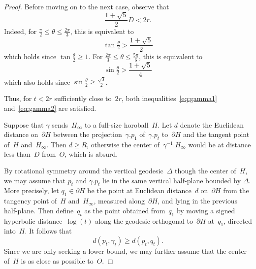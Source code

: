 \documentclass[10pt,a4paper]{amsart}
\newcommand{\HH}{{\mathbb H}}
\begin{document}
\begin{proof}
\medskip

Before moving on to the next case, observe that 
\[
\frac{1+\sqrt{5}}{2} D < 2r.
\]
Indeed, for $\frac{\pi}{2} \leq \theta \leq \frac{2\pi}{3}$, this is equivalent to
\[
\tan \tfrac{\theta}{2} > \frac{1+\sqrt{5}}{2}
\]
which holds since $\tan \frac{\theta}{2} \geq 1$.
For $\frac{2\pi}{3} \leq \theta \leq \frac{5\pi}{6}$, this is equivalent to
\[
\sin \tfrac{\theta}{2} > \frac{1+\sqrt{5}}{4}
\]
which also holds since $\sin \frac{\theta}{2} \geq \frac{\sqrt{3}}{2}$.

Thus, for $t<2r$ sufficiently close to~$2r$, both inequalities~\eqref{eq:gamma1} and~\eqref{eq:gamma2} are satisfied.

\medskip

Suppose that $\gamma$ sends~$H_\infty$ to a full-size horoball~$H$.
Let $d$ denote the Euclidean distance on~$\partial H$ between the projection~$\gamma.p_1$ of~$\gamma.p_t$ to~$\partial H$ and the tangent point of~$H$ and~$H_\infty$.
Then $d \geq R$, otherwise the center of~$\gamma^{-1}.H_\infty$ would be at distance less than~$D$ from~$O$, which is absurd.

By rotational symmetry around the vertical geodesic~$\Delta$ though the center of~$H$, we may assume that $p_t$ and $\gamma.p_t$ lie in the same vertical half-plane bounded by $\Delta$.
More precisely, let $q_1 \in \partial H$ be the point at Euclidean distance~$d$ on~$\partial H$ from the tangency point of~$H$ and~$H_\infty$, measured along~$\partial H$, and lying in the previous half-plane.
Then define~$q_t$ as the point obtained from~$q_1$ by moving a signed hyperbolic distance~$\log(t)$ along the geodesic orthogonal to~$\partial H$ at~$q_1$, directed into~$H$.
It follows that
\[
d(p_t,\gamma_t) \geq d(p_t,q_t).
\]
Since we are only seeking a lower bound, we may further assume that the center of~$H$ is as close as possible to~$O$.


\end{proof}
\end{document}
